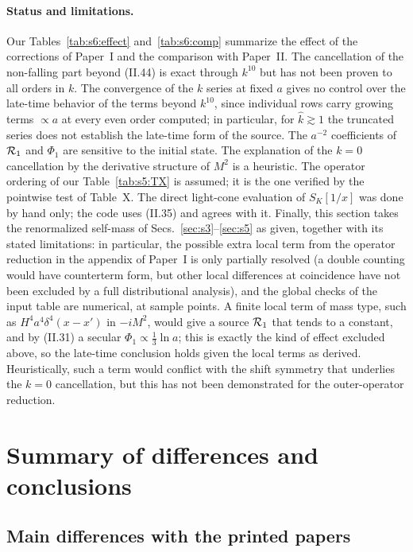 \documentclass[aps,prd,onecolumn,10pt,nofootinbib,floatfix]{revtex4-2}
\newcommand{\PI}{Paper~I}
\newcommand{\PII}{Paper~II}
\newcommand{\eqII}[1]{(II.#1)}
\newcommand{\khat}{\hat k}
\begin{document}
\paragraph*{Status and limitations.}
Our Tables~\ref{tab:s6:effect} and~\ref{tab:s6:comp} summarize the effect of the corrections of \PI{} and the comparison
with \PII\@. The cancellation of the non-falling part beyond \eqII{44} is exact through $k^{10}$ but has not been proven
to all orders in $k$. The convergence of the $k$ series at fixed $a$ gives no control over the late-time behavior of the terms
beyond $k^{10}$, since individual rows carry growing terms $\propto a$ at every even order computed; in particular, for $\khat\gtrsim1$ the
truncated series does not establish the late-time form of the source. The $a^{-2}$ coefficients
of $\mathcal{R}_1$ and $\Phi_1$ are sensitive to the initial state. The explanation of the $k=0$ cancellation by the
derivative structure of $M^2$ is a heuristic. The operator ordering of our Table~\ref{tab:s5:TX} is assumed; it is the
one verified by the pointwise test of Table~X\@. The direct light-cone evaluation of $S_K[1/x]$ was done by hand only;
the code uses \eqII{35} and agrees with it. Finally, this section takes the renormalized self-mass of
Secs.~\ref{sec:s3}--\ref{sec:s5} as given, together with its stated limitations: in particular, the possible extra local term from the operator
reduction in the appendix of \PI{} is only partially resolved (a double counting would have counterterm form, but other
local differences at coincidence have not been excluded by a full distributional analysis), and the global checks of
the input table are numerical, at sample points. A finite local term of mass type, such as $H^4a^4\delta^4(x-x')$ in $-iM^2$, would
give a source $\mathcal{R}_1$ that tends to a constant, and by \eqII{31} a secular $\Phi_1\propto\frac13\ln a$; this is exactly the kind
of effect excluded above, so the late-time conclusion holds given the local terms as derived. Heuristically, such a term would
conflict with the shift symmetry that underlies the $k=0$ cancellation, but this has not been demonstrated for the outer-operator
reduction.

\section{Summary of differences and conclusions}
\label{sec:s0s1s7s8:summary}

\subsection{Main differences with the printed papers}
\end{document}
